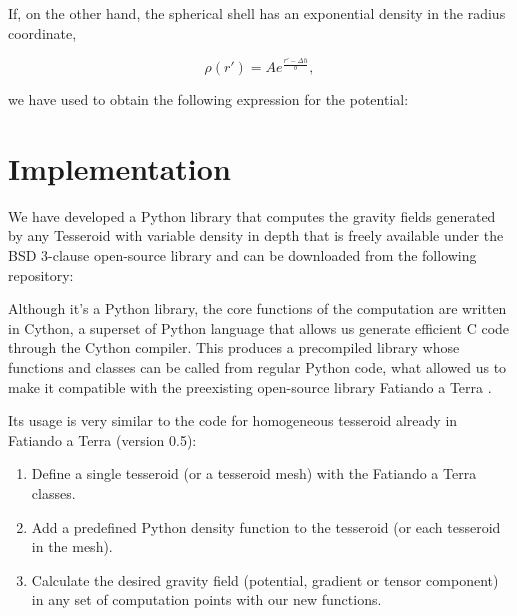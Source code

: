 \documentclass[extra]{gji}
\begin{document}
If, on the other hand, the spherical shell has an exponential density in the radius coordinate,

\begin{equation}
    \rho(r') = Ae^\frac{r'-\Delta h}{b},
\end{equation}

\noindent we have used \citet{sagemath} to obtain the following expression for the potential:



\section{Implementation}

We have developed a Python library that computes the gravity fields generated by any Tesseroid with variable density in depth that is freely available under the BSD 3-clause open-source library and can be downloaded from the following repository: 

Although it's a Python library, the core functions of the computation are written in Cython, a superset of Python language that allows us generate efficient C code through the Cython compiler.
This produces a precompiled library whose functions and classes can be called from regular Python code, what allowed us to make it compatible with the preexisting open-source library Fatiando a Terra \citep{Uieda2013}.

Its usage is very similar to the code for homogeneous tesseroid already in Fatiando a Terra (version 0.5):

\begin{enumerate}
\renewcommand{\theenumi}{(\arabic{enumi})}
\item Define a single tesseroid (or a tesseroid mesh) with the Fatiando a Terra classes.
\item Add a predefined Python density function to the tesseroid (or each tesseroid in the mesh).
\item Calculate the desired gravity field (potential, gradient or tensor component) in any set of computation points with our new functions.
\end{enumerate}
\end{document}
